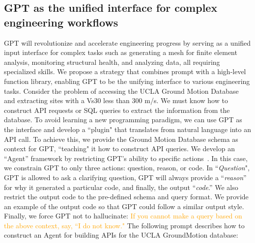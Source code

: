 \documentclass{article}
\begin{document}
\subsection{GPT as the unified interface for complex engineering workflows}

GPT will revolutionize and accelerate engineering progress by serving as a unified input interface for complex tasks such as generating a mesh for finite element analysis, monitoring structural health, and analyzing data, all requiring specialized skills. We propose a strategy that combines prompt with a high-level function library, enabling GPT to be the unifying interface to various engineering tasks. Consider the problem of accessing the UCLA Ground Motion Database~\citep{brandenburg2022} and extracting sites with a Vs30 less than 300 m/s. We must know how to construct API requests or SQL queries to extract the information from the database. To avoid learning a new programming paradigm, we can use GPT as the interface and develop a ``plugin" that translates from natural language into an API call. To achieve this, we provide the Ground Motion Database schema as context for GPT, ``teaching" it how to construct API queries. We develop an ``Agent” framework by restricting GPT’s ability to specific actions~\citep{yao2022react}. In this case, we constrain GPT to only three actions: question, reason, or code. In ``\textit{Question}", GPT is allowed to ask a clarifying question, GPT will always provide a ``\textit{reason}” for why it generated a particular code, and finally, the output ``\textit{code}.” We also restrict the output code to the pre-defined schema and query format. We provide an example of the output code so that GPT could follow a similar output style. Finally, we force GPT not to hallucinate: \textcolor{orange}{If you cannot make a query based on the above context, say, ``I do not know." }The following prompt describes how to construct an Agent for building APIs for the UCLA GroundMotion database:\\\\
\end{document}
